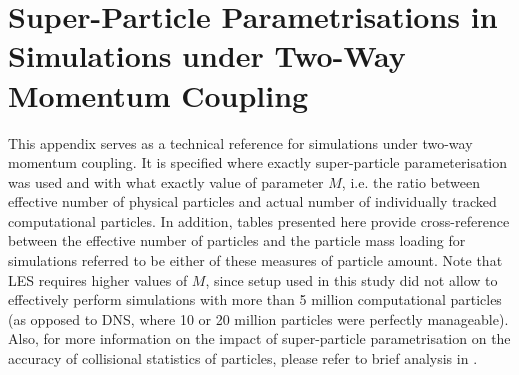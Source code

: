 \documentclass{pracamgren}
\begin{document}
\chapter{Super-Particle Parametrisations in Simulations under Two-Way Momentum Coupling}
\label{app:spp}

This appendix serves as a technical reference for simulations under two-way momentum coupling.
It is specified where exactly super-particle parameterisation was used and with what exactly value of parameter $M$, i.e. the ratio between effective number of physical particles and actual number of individually tracked computational particles.
In addition, tables presented here provide cross-reference between the effective number of particles and the particle mass loading for simulations referred to be either of these measures of particle amount.
Note that LES requires higher values of $M$, since setup used in this study did not allow to effectively perform simulations with more than 5 million computational particles (as opposed to DNS, where 10 or 20 million particles were perfectly manageable).
Also, for more information on the impact of super-particle parametrisation on the accuracy of collisional statistics of particles, please refer to brief analysis in \textcite{Rosa2022}.  
\end{document}
